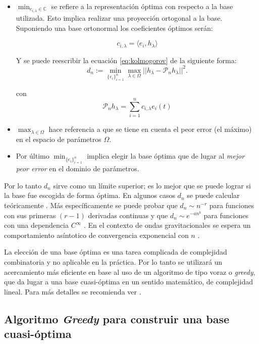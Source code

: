 \begin{itemize}
\item $\min_{ c_{i,\lambda} \in \mathbb{C}}$ se refiere a la representación óptima con respecto a la base utilizada. Esto implica realizar una proyección ortogonal a la base. Suponiendo una base ortonormal los coeficientes óptimos serán:

\begin{equation} \label{eq:coefs}
c_{i, \lambda} = \langle e_i, h_{\lambda} \rangle 
\end{equation}

Y se puede reescribir la ecuación \eqref{eq:kolmogorov} de la siguiente forma:
\[
d_n := \min_{\{e_i\}_{i=1}^n} \max_{\lambda \in \Omega} || h_{\lambda} - \mathcal{P}_nh_{\lambda} ||^2.
\]

con 
\[
\mathcal{P}_nh_{\lambda} = \sum_{i=1}^{n} c_{i,\lambda} e_i(t)
\]

\item $\max_{\lambda \in \Omega}$ hace referencia a que se tiene en cuenta el peor error (el máximo) en el espacio de parámetros $\Omega$. 
\item Por último $\min_{\{e_i\}_{i=1}^n}$ implica elegir la base óptima que de lugar al \textit{mejor peor error} en el dominio de parámetros.
\end{itemize}

Por lo tanto $d_n$ sirve como un límite superior; es lo mejor que se puede lograr si la base fue escogida de forma óptima.
En algunos casos $d_n$ se puede calcular teóricamente \cite{MAGARILILYAEV200197}. Más específicamente se puede probar que $d_n \sim n^{-r}$ para funciones con sus primeras $(r-1)$ derivadas continuas y que $d_n \sim e^{-an^b}$ para funciones con una dependencia $C^{\infty}$  \cite{articleg}. En el contexto de ondas gravitacionales se espera un comportamiento asíntotico de convergencia exponencial con $n$ \citep{PhysRevX.4.031006, Herrmann:2012xpx}.

La elección de una base óptima es una tarea complicada de complejidad combinatoria y no aplicable en la práctica. Por lo tanto se utilizará un acercamiento más eficiente en base al uso de un algoritmo de tipo voraz o \textit{greedy}, que da lugar a una base cuasi-óptima en un sentido matemático, de complejidad lineal. Para más detalles se recomienda ver \cite{Tiglio:2021ysj}.

\subsection{Algoritmo \textit{Greedy} para construir una base cuasi-óptima}

